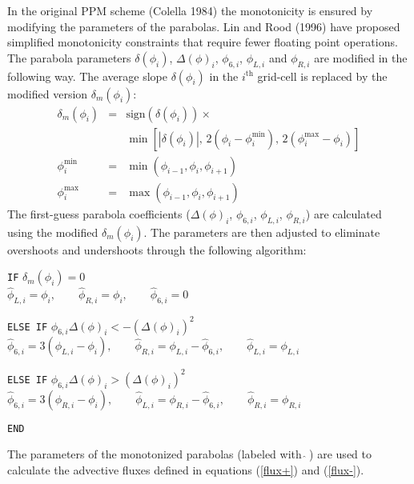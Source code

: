   In the original PPM scheme (Colella 1984) the monotonicity is ensured
  by modifying the parameters of the parabolas. Lin and Rood (1996) have
  proposed simplified monotonicity constraints that require fewer
  floating point operations. The parabola parameters $\delta(\phi_{i})$,
  $\Delta(\phi)_{i}$, $\phi_{6,i}$, $\phi_{L,i}$ and $\phi_{R,i}$ are
  modified in the following way. The average slope $\delta(\phi_{i})$ in
  the $i^{\mathrm{th}}$ grid-cell is replaced by the modified version
  $\delta_{m}(\phi_{i})$:  
  \begin{eqnarray}
    \delta_{m}(\phi_{i}) &=& \mathrm{sign}(\delta(\phi_{i})) \times \\
    \nonumber
    & & \min \left [ |\delta(\phi_{i}) |, \,
      2(\phi_{i}-\phi^{\mathrm{min}}_{i}), \, 2(\phi^{\mathrm{max}}_{i} -
    \phi_{i}) \right ] \\    \nonumber
    \phi^{\mathrm{min}}_{i}&=& \min (\phi_{i-1}, \phi_{i},
    \phi_{i+1}) \\ \nonumber
    \phi^{\mathrm{max}}_{i} &=& \max (\phi_{i-1}, \phi_{i}, \phi_{i+1})
  \end{eqnarray}
  The first-guess parabola coefficients ($\Delta(\phi)_{i}$,
  $\phi_{6,i}$, $\phi_{L,i}$, $\phi_{R,i}$) are calculated using the
  modified $\delta_{m}(\phi_{i})$. The parameters are then adjusted to
  eliminate overshoots and undershoots through the following algorithm:
  \begin{description}
    \label{ppm01}
    \item \texttt{IF} \hspace{5mm} $\delta_{m}(\phi_{i}) = 0$ \\       
       $\hat{\phi}_{L,i} = \phi_{i}, \qquad \hat{\phi}_{R,i} = \phi_{i}, \qquad
       \hat{\phi}_{6,i} = 0$
    \item \texttt{ELSE IF} \hspace{5mm} $\phi_{6,i} \Delta(\phi)_{i} <
      -(\Delta(\phi)_{i})^{2}$ \\
       $\hat{\phi}_{6,i} = 3(\phi_{L,i} - \phi_{i}), \qquad \hat{\phi}_{R,i} =
       \phi_{L,i} - \hat{\phi}_{6,i}, \qquad \hat{\phi}_{L,i} = \phi_{L,i}$
    \item \texttt{ELSE IF} \hspace{5mm} $\phi_{6,i} \Delta(\phi)_{i} >
      (\Delta(\phi)_{i})^{2}$ \\
       $\hat{\phi}_{6,i} = 3(\phi_{R,i} - \phi_{i}), \qquad \hat{\phi}_{L,i} =
       \phi_{R,i} - \hat{\phi}_{6,i}, \qquad \hat{\phi}_{R,i} =
       \phi_{R,i}$
    \item \texttt{END}
  \end{description}
  The parameters of the monotonized parabolas (labeled with
  $\hat{\,}\,$) are used to calculate the advective fluxes defined in
  equations (\ref{flux+}) and (\ref{flux-}).

